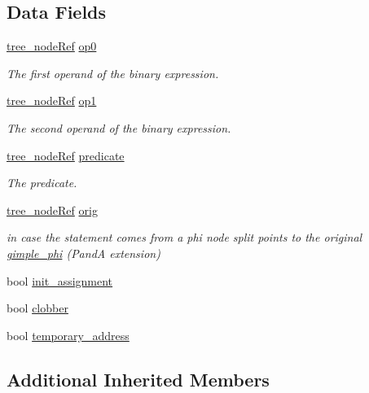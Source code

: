 \subsection*{Data Fields}
\begin{DoxyCompactItemize}
\item 
\hyperlink{tree__node_8hpp_a6ee377554d1c4871ad66a337eaa67fd5}{tree\+\_\+node\+Ref} \hyperlink{structgimple__assign_a44a5273993b6c90e7f1cb32b5450fed8}{op0}
\begin{DoxyCompactList}\small\item\em The first operand of the binary expression. \end{DoxyCompactList}\item 
\hyperlink{tree__node_8hpp_a6ee377554d1c4871ad66a337eaa67fd5}{tree\+\_\+node\+Ref} \hyperlink{structgimple__assign_a989a63b4d607c1c6d2543089c17f9e93}{op1}
\begin{DoxyCompactList}\small\item\em The second operand of the binary expression. \end{DoxyCompactList}\item 
\hyperlink{tree__node_8hpp_a6ee377554d1c4871ad66a337eaa67fd5}{tree\+\_\+node\+Ref} \hyperlink{structgimple__assign_aa6108e3d98b4e73c1401f1711096baa6}{predicate}
\begin{DoxyCompactList}\small\item\em The predicate. \end{DoxyCompactList}\item 
\hyperlink{tree__node_8hpp_a6ee377554d1c4871ad66a337eaa67fd5}{tree\+\_\+node\+Ref} \hyperlink{structgimple__assign_ab154230ba593420c0c7bc5c98ca3586b}{orig}
\begin{DoxyCompactList}\small\item\em in case the statement comes from a phi node split points to the original \hyperlink{structgimple__phi}{gimple\+\_\+phi} (PandA extension) \end{DoxyCompactList}\item 
bool \hyperlink{structgimple__assign_a4590b7cabbdd727cdcb2136b21e65789}{init\+\_\+assignment}
\item 
bool \hyperlink{structgimple__assign_a6e39adec1ec67b7ac37d0086d7c5f3d4}{clobber}
\item 
bool \hyperlink{structgimple__assign_aa674c74327e0f2f526424ca35dd453c8}{temporary\+\_\+address}
\end{DoxyCompactItemize}
\subsection*{Additional Inherited Members}


